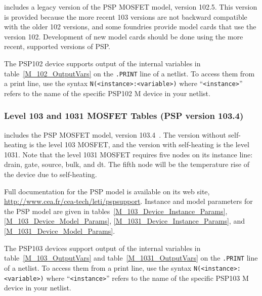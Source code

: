 \Xyce{} includes a legacy version of the PSP MOSFET model, version
102.5.  This version is provided because the more recent 103 versions
are not backward compatible with the older 102 versions, and some
foundries provide model cards that use the version 102.  Development
of new model cards should be done using the more recent, supported
versions of PSP.

The PSP102 device supports output of the internal variables in
table~\ref{M_102_OutputVars} on the \texttt{.PRINT} line of a netlist.
To access them from a print line, use the syntax
\texttt{N(<instance>:<variable>)} where ``\texttt{<instance>}'' refers to the
name of the specific PSP102 M device in your netlist.





\subsubsection{Level 103 and 1031 MOSFET Tables (PSP version 103.4)}

\Xyce{} includes the PSP MOSFET model, version 103.4~\cite{PSP:2006}.
The version without self-heating is the level 103 MOSFET, and the
version with self-heating is the level 1031.  Note that the level 1031
MOSFET requires five nodes on its instance line: drain, gate, source,
bulk, and dt.  The fifth node will be the temperature rise of the
device due to self-heating.

Full documentation for the PSP model is available on its web site,
\url{http://www.cea.fr/cea-tech/leti/pspsupport}.  Instance and model
parameters for the PSP model are given in
tables~\ref{M_103_Device_Instance_Params}, \ref{M_103_Device_Model_Params},
\ref{M_1031_Device_Instance_Params}, and \ref{M_1031_Device_Model_Params}.

The PSP103 devices support output of the internal variables in
table~\ref{M_103_OutputVars} and table~\ref{M_1031_OutputVars} on the \texttt{.PRINT} line of a netlist.
To access them from a print line, use the syntax
\texttt{N(<instance>:<variable>)} where ``\texttt{<instance>}'' refers to the
name of the specific PSP103 M device in your netlist.








\clearpage
